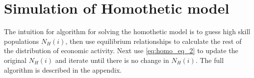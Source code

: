 \documentclass{article}
\begin{document}
% 
% 
% 
% 

\section{Simulation of Homothetic model}

The intuition for algorithm for solving the homothetic model is to guess high skill populations $N_H(i)$, then use equilibrium relationships to calculate the rest of the distribution of economic activity.  Next use \eqref{eq:homo_eq_2} to update the original $N_H(i)$ and iterate until there is no change in $N_H(i)$.  The full algorithm is described in the appendix.
\end{document}
